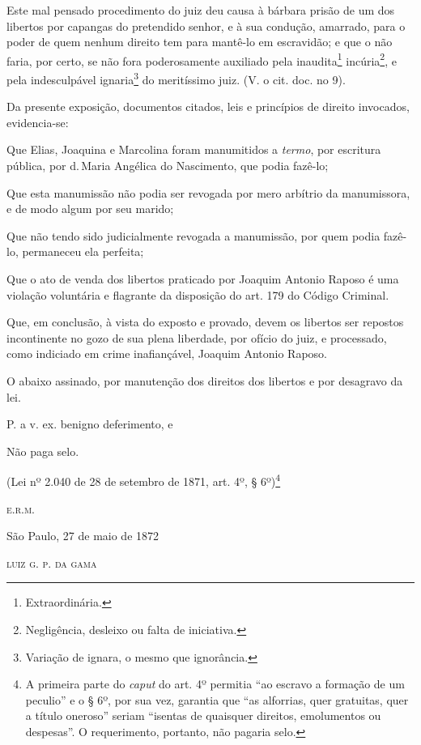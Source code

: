 Este mal pensado procedimento do juiz deu causa à bárbara prisão de um
dos libertos por capangas do pretendido senhor, e à sua condução,
amarrado, para o poder de quem nenhum direito tem para mantê-lo em
escravidão; e que o não faria, por certo, se não fora poderosamente
auxiliado pela inaudita\footnote{ Extraordinária.} incúria\footnote{
  Negligência, desleixo ou falta de iniciativa.}, e pela indesculpável
ignaria\footnote{ Variação de ignara, o mesmo que ignorância.} do
meritíssimo juiz. (V. o cit. doc. no 9).

Da presente exposição, documentos citados, leis e princípios de direito
invocados, evidencia-se:

Que Elias, Joaquina e Marcolina foram manumitidos a \emph{termo}, por
escritura pública, por d.\,Maria Angélica do Nascimento, que podia
fazê-lo;

Que esta manumissão não podia ser revogada por mero arbítrio da
manumissora, e de modo algum por seu marido;

Que não tendo sido judicialmente revogada a manumissão, por quem podia
fazê-lo, permaneceu ela perfeita;

Que o ato de venda dos libertos praticado por Joaquim Antonio Raposo é
uma violação voluntária e flagrante da disposição do art. 179 do Código
Criminal.

Que, em conclusão, à vista do exposto e provado, devem os libertos ser
repostos incontinente no gozo de sua plena liberdade, por ofício do
juiz, e processado, como indiciado em crime inafiançável, Joaquim
Antonio Raposo.

O abaixo assinado, por manutenção dos direitos dos libertos e por
desagravo da lei.

P. a v. ex. benigno deferimento, e

Não paga selo.

(Lei nº 2.040 de 28 de setembro de 1871, art. 4º, § 6º)\footnote{ A
  primeira parte do \emph{caput} do art. 4º permitia ``ao escravo a
  formação de um peculio'' e o § 6º, por sua vez, garantia que ``as
  alforrias, quer gratuitas, quer a título oneroso'' seriam ``isentas de
  quaisquer direitos, emolumentos ou despesas''. O requerimento,
  portanto, não pagaria selo.}

\begin{flushright}
\textsc{e.r.m.}

São Paulo, 27 de maio de 1872

\textsc{luiz g. p. da gama}
\end{flushright}

